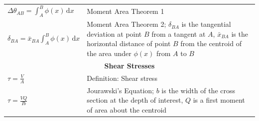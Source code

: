 \documentclass[twocolumn]{article}
\newcommand{\dd}[1]{\mathrm{d}#1}
\newcommand{\formulasection}[1]{\multicolumn{2}{c}{\textbf{#1}}}
\begin{document}
\begin{tabularx}{\linewidth}{l X}
    \(\Delta \theta_{AB} = \int_A^B \phi(x)\,\dd x\) & Moment Area Theorem 1 \\
    \(\delta_{BA} = \bar{x}_{BA}\int_A^B \phi(x)\,\dd x\) & Moment Area Theorem 2; \(\delta_{BA}\) is the tangential
        deviation at point \(B\) from a tangent at \(A\), \(\bar{x}_{BA}\) is the horizontal distance of point \(B\)
        from the centroid of the area under \(\phi(x)\) from \(A\) to \(B\) \\
    \hline
    \formulasection{Shear Stresses} \\
    \(\tau = \frac{V}{A}\) & Definition: Shear stress \\
    \rule{0pt}{4ex}\(\tau = \frac{VQ}{Ib}\) & Jourawski's Equation; \(b\) is the width of the cross section at the
        depth of interest, \(Q\) is a first moment of area about the centroid \\
\end{tabularx}
    
\end{document}
